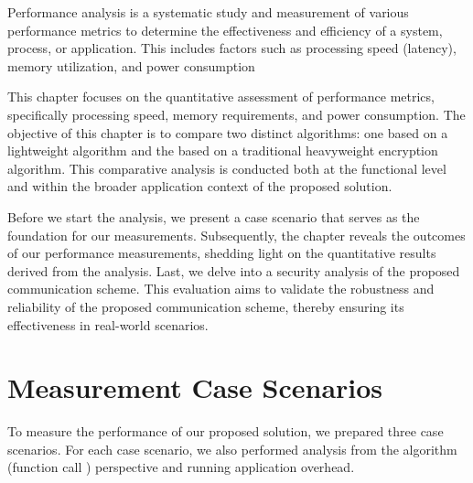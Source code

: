 
Performance analysis is a systematic study and measurement of various performance metrics to determine the effectiveness and efficiency of a system, process, or application. This includes factors such as processing speed (latency), memory utilization, and power consumption

This chapter focuses on the quantitative assessment of performance metrics, specifically processing speed, memory requirements, and power consumption. The objective of this chapter is to compare two distinct algorithms: one based on a lightweight algorithm and the based on a traditional heavyweight encryption algorithm. This comparative analysis is conducted both at the functional level and within the broader application context of the proposed solution.

Before we start the analysis, we present a case scenario that serves as the foundation for our measurements. Subsequently, the chapter reveals the outcomes of our performance measurements, shedding light on the quantitative results derived from the analysis. Last, we delve into a security analysis of the proposed communication scheme. This evaluation aims to validate the robustness and reliability of the proposed communication scheme, thereby ensuring its effectiveness in real-world scenarios.




\section{Measurement Case Scenarios}

To measure the performance of our proposed solution, we prepared three case scenarios. For each case scenario, we also performed analysis from the algorithm (function call ) perspective and running application overhead. 

